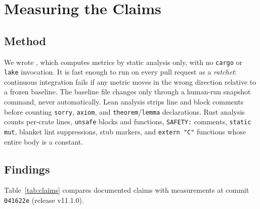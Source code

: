 \documentclass[sigconf,nonacm]{acmart}
\begin{document}
\section{Measuring the Claims}\label{sec:audit}
\subsection{Method}
We wrote , which computes metrics by static analysis only, with no \texttt{cargo} or \texttt{lake} invocation. It is fast enough to run on every pull request as a \emph{ratchet}: continuous integration fails if any metric moves in the wrong direction relative to a frozen baseline. The baseline file changes only through a human-run snapshot command, never automatically. Lean analysis strips line and block comments before counting \texttt{sorry}, \texttt{axiom}, and \texttt{theorem}/\texttt{lemma} declarations. Rust analysis counts per-crate lines, \texttt{unsafe} blocks and functions, \texttt{SAFETY:} comments, \texttt{static mut}, blanket lint suppressions, stub markers, and \texttt{extern "C"} functions whose entire body is a constant.

\subsection{Findings}
Table~\ref{tab:claims} compares documented claims with measurements at commit \texttt{041622e} (release v11.1.0).
\end{document}
